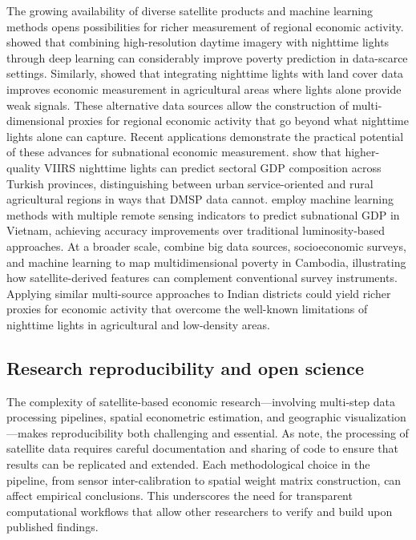 \documentclass[
  a4paper, 
  twoside,
  review
]{article}
\newcounter{code}
\begin{document}
The growing availability of diverse satellite products and machine
learning methods opens possibilities for richer measurement of regional
economic activity. \citet{jean_etal_poverty_prediction} showed that
combining high-resolution daytime imagery with nighttime lights through
deep learning can considerably improve poverty prediction in data-scarce
settings. Similarly, \citet{keola_etal_lights_poverty} showed that
integrating nighttime lights with land cover data improves economic
measurement in agricultural areas where lights alone provide weak
signals. These alternative data sources allow the construction of
multi-dimensional proxies for regional economic activity that go beyond
what nighttime lights alone can capture. Recent applications demonstrate
the practical potential of these advances for subnational economic
measurement. \citet{chen_etal_turkey_viirs} show that higher-quality
VIIRS nighttime lights can predict sectoral GDP composition across
Turkish provinces, distinguishing between urban service-oriented and
rural agricultural regions in ways that DMSP data cannot.
\citet{hussein_etal_vietnam_ml} employ machine learning methods with
multiple remote sensing indicators to predict subnational GDP in
Vietnam, achieving accuracy improvements over traditional
luminosity-based approaches. At a broader scale,
\citet{theara_etal_cambodia_poverty} combine big data sources,
socioeconomic surveys, and machine learning to map multidimensional
poverty in Cambodia, illustrating how satellite-derived features can
complement conventional survey instruments. Applying similar
multi-source approaches to Indian districts could yield richer proxies
for economic activity that overcome the well-known limitations of
nighttime lights in agricultural and low-density areas.

\subsection{Research reproducibility and open
science}\label{research-reproducibility-and-open-science}

The complexity of satellite-based economic research---involving
multi-step data processing pipelines, spatial econometric estimation,
and geographic visualization---makes reproducibility both challenging
and essential. As \citet{donaldson_storeygard_remotesensing} note, the
processing of satellite data requires careful documentation and sharing
of code to ensure that results can be replicated and extended. Each
methodological choice in the pipeline, from sensor inter-calibration to
spatial weight matrix construction, can affect empirical conclusions.
This underscores the need for transparent computational workflows that
allow other researchers to verify and build upon published findings.
\end{document}
